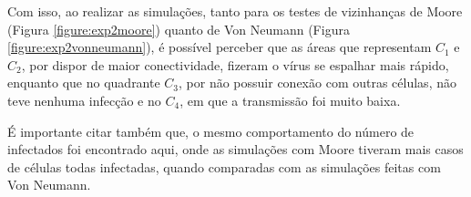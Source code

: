 \documentclass[a4paper,12pt]{article}
\begin{document}
Com isso, ao realizar as simulações, tanto para os testes de vizinhanças de Moore (Figura \ref{figure:exp2moore}) quanto de Von Neumann (Figura \ref{figure:exp2vonneumann}), é possível perceber que as áreas que representam $C_1$ e $C_2$, por dispor de maior conectividade, fizeram o vírus se espalhar mais rápido, enquanto que no quadrante $C_3$, por não possuir conexão com outras células, não teve nenhuma infecção e no $C_4$, em que a transmissão foi muito baixa. 

\newpage
É importante citar também que, o mesmo comportamento do número de infectados foi encontrado aqui, onde as simulações com Moore tiveram mais casos de células todas infectadas, quando comparadas com as simulações feitas com Von Neumann. \\

\begin{figure}[!ht]
\captionsetup[subfigure]{labelformat=empty}
\centering
{}
\qquad
{}
\qquad
{}
\qquad
{}

\end{figure}
\end{document}
